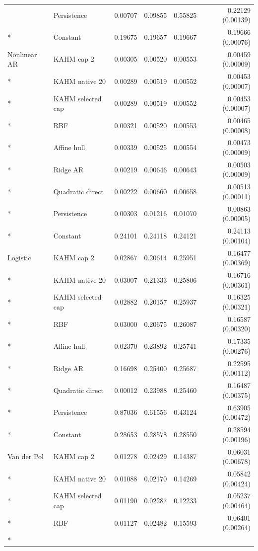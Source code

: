 \begin{longtable}{@{}llrrrr@{}}
 & Persistence & 0.00707 & 0.09855 & 0.55825 & 0.22129 (0.00139) \\*
 & Constant & 0.19675 & 0.19657 & 0.19667 & 0.19666 (0.00076) \\
\addlinespace
Nonlinear AR & KAHM cap 2 & 0.00305 & 0.00520 & 0.00553 & 0.00459 (0.00009) \\*
 & KAHM native 20 & 0.00289 & 0.00519 & 0.00552 & 0.00453 (0.00007) \\*
 & KAHM selected cap & 0.00289 & 0.00519 & 0.00552 & 0.00453 (0.00007) \\*
 & RBF & 0.00321 & 0.00520 & 0.00553 & 0.00465 (0.00008) \\*
 & Affine hull & 0.00339 & 0.00525 & 0.00554 & 0.00473 (0.00009) \\*
 & Ridge AR & 0.00219 & 0.00646 & 0.00643 & 0.00503 (0.00009) \\*
 & Quadratic direct & 0.00222 & 0.00660 & 0.00658 & 0.00513 (0.00011) \\*
 & Persistence & 0.00303 & 0.01216 & 0.01070 & 0.00863 (0.00005) \\*
 & Constant & 0.24101 & 0.24118 & 0.24121 & 0.24113 (0.00104) \\
\addlinespace
Logistic & KAHM cap 2 & 0.02867 & 0.20614 & 0.25951 & 0.16477 (0.00369) \\*
 & KAHM native 20 & 0.03007 & 0.21333 & 0.25806 & 0.16716 (0.00361) \\*
 & KAHM selected cap & 0.02882 & 0.20157 & 0.25937 & 0.16325 (0.00321) \\*
 & RBF & 0.03000 & 0.20675 & 0.26087 & 0.16587 (0.00320) \\*
 & Affine hull & 0.02370 & 0.23892 & 0.25741 & 0.17335 (0.00276) \\*
 & Ridge AR & 0.16698 & 0.25400 & 0.25687 & 0.22595 (0.00112) \\*
 & Quadratic direct & 0.00012 & 0.23988 & 0.25460 & 0.16487 (0.00375) \\*
 & Persistence & 0.87036 & 0.61556 & 0.43124 & 0.63905 (0.00472) \\*
 & Constant & 0.28653 & 0.28578 & 0.28550 & 0.28594 (0.00196) \\
\addlinespace
Van der Pol & KAHM cap 2 & 0.01278 & 0.02429 & 0.14387 & 0.06031 (0.00678) \\*
 & KAHM native 20 & 0.01088 & 0.02170 & 0.14269 & 0.05842 (0.00424) \\*
 & KAHM selected cap & 0.01190 & 0.02287 & 0.12233 & 0.05237 (0.00464) \\*
 & RBF & 0.01127 & 0.02482 & 0.15593 & 0.06401 (0.00264) \\*

\end{longtable}
